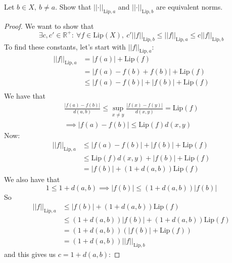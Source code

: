 \documentclass{article}
\newcommand{\norm}[1]{\left|\left|#1\right|\right|}
\newcommand{\abs}[1]{\left|#1\right|}
\newcommand{\parens}[1]{\left(#1\right)}
\newcommand{\R}{\mathbb{R}}
\newcommand{\lip}[1]{\text{Lip}\parens{#1}}
\begin{document}
            \item Let $b \in X,\ b\neq a$. Show that $
            \norm{\cdot}_{\text{Lip},a}$ and 
            $\norm{\cdot}_{\text{Lip},b}$ are equivalent norms.
            \begin{proof}
            We want to show that 
            $$\exists c, c' \in \R^+:\ \forall f \in \lip{X},\
            c'\norm{f}_{\text{Lip},b} \leq
            \norm{f}_{\text{Lip},a} \leq c\norm{f}
            _{\text{Lip},b}$$
            To find these constants, let's start with 
            $\norm{f}_{\text{Lip},a}$:
            \begin{align*}
            \norm{f}_{\text{Lip},a} &= \abs{f(a)} + \lip{f} \\
            &= \abs{f(a) - f(b) + f(b)} + \lip{f} \\
            &\leq \abs{f(a) - f(b)} + \abs{f(b)} + \lip{f} \\
            \end{align*}
            We have that 
            \begin{gather*}
            \frac{\abs{f(a) - f(b)}}{d(a,b)} \leq \sup_{x\neq y}
            \frac{\abs{f(x) - f(y)}}{d(x,y)} = \lip{f} \\
            \implies \abs{f(a) - f(b)} \leq \lip{f}d(x,y)
            \end{gather*}
            Now:
            \begin{align*}
            \norm{f}_{\text{Lip},a} &\leq \abs{f(a) - f(b)} 
            + \abs{f(b)} + \lip{f} \\
            &\leq \lip{f}d(x,y) + \abs{f(b)} + \lip{f} \\
            &= \abs{f(b)} + \parens{1 + d(a,b)}\lip{f}
            \end{align*}
            We also have that
            $$1 \leq 1 + d(a,b) \implies \abs{f(b)} \leq 
            \parens{1 + d(a,b)}\abs{f(b)}$$
            So
            \begin{align*}
            \norm{f}_{\text{Lip},a} &\leq \abs{f(b)} + 
            \parens{1 + d(a,b)}\lip{f} \\ 
            &\leq \parens{1 + d(a,b)}\abs{f(b)} + 
            \parens{1 + d(a,b)}\lip{f} \\
            &= \parens{1 + d(a,b)}\parens{\abs{f(b)} + \lip{f}} \\
            &= \parens{1 + d(a,b)}\norm{f}_{\text{Lip}, b}
            \end{align*}
            and this gives us $c = 1 + d(a,b)$:

\end{proof}
\end{document}
